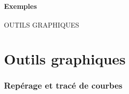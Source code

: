 \documentclass[a4paper,french,11pt]{article}
\begin{document}
\begin{PresCodePL}{}
\end{PresCodePL}

\subsection{Exemples}

\begin{PresCodePL}{}
\end{PresCodePL}

\begin{PresCodePL}{}
\end{PresCodePL}

\begin{PresCodePL}{}
\end{PresCodePL}

\begin{PresCodePL}{}
\end{PresCodePL}

\begin{PresCodePL}{}
\end{PresCodePL}

\begin{PresCodePL}{}
\end{PresCodePL}

\newpage

\phantom{t}\par\vfill\par
\begin{PART}
	\begin{center}
		\Huge\MakeUppercase{Outils graphiques}
	\end{center}
\end{PART}
\par\vfill\par\phantom{t}

\newpage

\part{Outils graphiques}

\section{Repérage et tracé de courbes}\label{reperagetikz}
\end{document}
